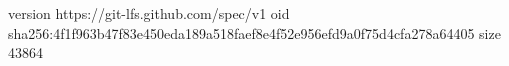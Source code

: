version https://git-lfs.github.com/spec/v1
oid sha256:4f1f963b47f83e450eda189a518faef8e4f52e956efd9a0f75d4cfa278a64405
size 43864
